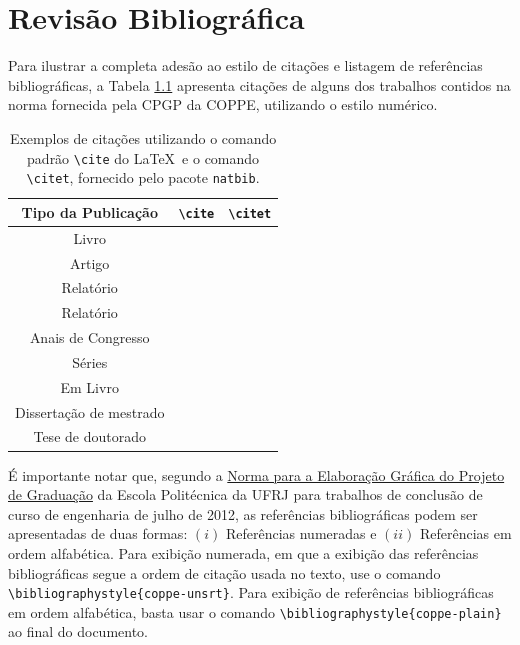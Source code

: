\documentclass[grad,numbers]{coppe}
\begin{document}
  \chapter{Revisão Bibliográfica}

  Para ilustrar a completa adesão ao estilo de citações e listagem de
  referências bibliográficas, a Tabela \ref{tab:citation} apresenta citações de alguns dos trabalhos contidos na norma fornecida pela CPGP da
  COPPE, utilizando o estilo numérico.

  \begin{table}[h]
  \caption{Exemplos de citações utilizando o comando padrão
    \texttt{\textbackslash cite} do \LaTeX\ e
    o comando \texttt{\textbackslash citet},
    fornecido pelo pacote \texttt{natbib}.}
  \label{tab:citation}
  \centering
  {\footnotesize
  \begin{tabular}{|c|c|c|}
  	\hline
  	  Tipo da Publicação    &         \verb|\cite|         &         \verb|\citet|         \\ \hline
  	         Livro          &     \cite{book-example}      &     \citet{book-example}      \\
  	        Artigo          &    \cite{article-example}    &    \citet{article-example}    \\
  	       Relatório        &  \cite{techreport-example}   &  \citet{techreport-example}   \\
  	       Relatório        & \cite{techreport-exampleIn}  & \citet{techreport-exampleIn}  \\
  	  Anais de Congresso    & \cite{inproceedings-example} & \citet{inproceedings-example} \\
  	        Séries          & \cite{incollection-example}  & \citet{incollection-example}  \\
  	       Em Livro         &    \cite{inbook-example}     &    \citet{inbook-example}     \\
  	Dissertação de mestrado & \cite{mastersthesis-example} & \citet{mastersthesis-example} \\
  	   Tese de doutorado    &   \cite{phdthesis-example}   &   \citet{phdthesis-example}   \\ \hline
  \end{tabular}}
  \end{table}
  
  É importante notar que, segundo a \href{http://www.poli.ufrj.br/graduacao_projeto.php}{Norma para a Elaboração Gráfica do Projeto de Graduação} da Escola Politécnica da UFRJ para trabalhos de conclusão de curso de engenharia de julho de 2012, as referências bibliográficas podem ser apresentadas de duas formas: $(i)$ Referências numeradas e $(ii)$ Referências em ordem alfabética. Para exibição numerada, em que a exibição das referências bibliográficas segue a ordem de citação usada no texto, use o comando \texttt{\textbackslash bibliographystyle\{coppe-unsrt\}}. Para exibição de referências bibliográficas em ordem alfabética, basta usar o comando \texttt{\textbackslash bibliographystyle\{coppe-plain\}} ao final do documento. 
  
\end{document}
